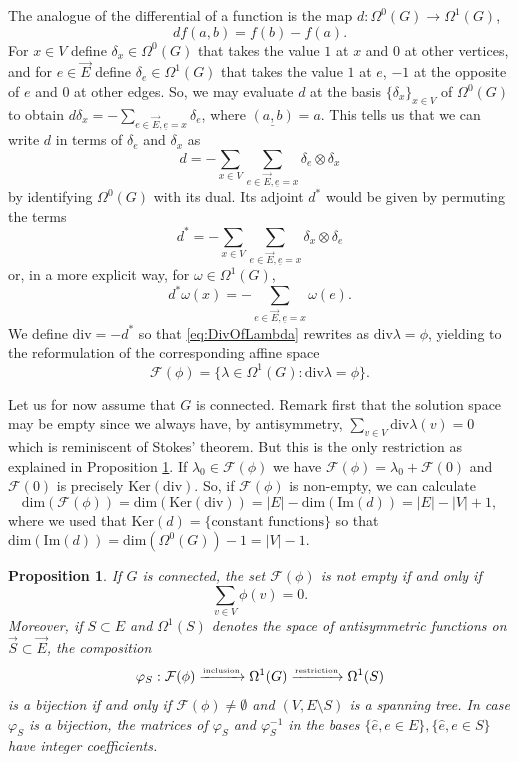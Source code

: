 \documentclass[11pt,a4paper]{amsart}
\numberwithin{equation}{section}
\newtheorem{proposition}[theorem]{Proposition}
\theoremstyle{definition}
\begin{document}
The analogue of the differential
of a function is the map
$d: \Omega^0(G) \to \Omega^1(G)$,
\[d f (a,b) = f(b) - f(a).\] 
For $x \in V$ define $\delta_{x} \in \Omega^0(G)$ 
that takes the value
 $1$ at $x$ and $0$ at other vertices, and
for $e \in \vec E$ define
$\delta_{e} \in \Omega^1(G)$ that takes the value
$1$ at $e$, $-1$ at the opposite of $e$
and $0$ at other edges. So, we may evaluate
$d$ at the basis
$\{\delta_{x} \}_{x \in V}$ of $\Omega^0(G)$ to obtain
$d \delta_{x} = -\sum_{e \in \vec E,\underline e = x} \delta_{e}$,
where $\underline {(a,b)} = a$. This tells
us that we can write $d$ in terms of 
$\delta_{e}$ and $\delta_{x}$ as
\[d = -\sum_{x \in V} 
\sum_{e \in \vec E, \underline e = x} \delta_{e} \otimes \delta_{x}\]
by identifying
$\Omega^0(G)$ with its dual. Its adjoint $d^*$
would be given by permuting the terms
\[d^* = -\sum_{x \in V} 
\sum_{e \in \vec E, \underline e = x}  \delta_{x} \otimes \delta_{e}\]
or, in a more explicit way, for 
$\omega \in \Omega^1(G)$,
\[d^* \omega (x) = - \sum_{e \in \vec E, \underline e=x}
\omega(e) .\]
We define $\mathrm {div} = -d^*$ so that 
	\eqref{eq:DivOfLambda}
rewrites as
	$\mathrm{div}\lambda = \phi$, yielding to the reformulation of the corresponding affine space 
	 \[\mathcal F(\phi)
	 = 	\{\lambda \in \Omega^1(G):
	  \mathrm{div}\lambda = \phi
	 \}.\]
	 
Let us for now assume that $G$ is connected. Remark first that the solution space may be empty since we
always have, by antisymmetry,
	$\sum_{v \in V} \mathrm{div} \lambda (v)
	= 0$
	which is reminiscent of
	Stokes' theorem. But this is the only
	restriction as explained in Proposition \ref{prop:BijectionTrees}. If
	$\lambda_0 \in \mathcal F(\phi)$ we have
	$\mathcal F(\phi) = 
	\lambda_0 + \mathcal F(0)$ and
	$\mathcal F(0)$ is precisely
	$\mathrm{Ker}(\mathrm{div})$. So, if
	$\mathcal F(\phi)$ is non-empty,
	we can calculate
	\[\mathrm{dim}(\mathcal F(\phi))
	= \mathrm{dim}(\mathrm{Ker}(\mathrm{div}))
	= |E| - \mathrm{dim}(\mathrm{Im}(d))
	= |E| - |V| + 1,\]
	where we used that $\mathrm{Ker}(d) =
	\{\mbox{constant functions}\} $
	 so that
	$ \mathrm{dim}(\mathrm{Im}(d)) = 
	\mathrm{dim}(\Omega^0(G)) - 1 = |V|-1$.
	
	
\begin{proposition} \label{prop:BijectionTrees}
	If $G$ is connected, the set
	$\mathcal F(\phi) $ is not empty if and only if
\begin{equation} \label{eq:ExistenceCondition}
\sum_{v \in V} \phi(v)=0.
\end{equation}
	Moreover, if $S \subset E$
	and  $\Omega^1(S)$ denotes the space of antisymmetric
	functions on $\vec S \subset \vec E$, the composition
	\[\varphi_S:\mathcal F(\phi) \xrightarrow[]{
	\mbox{\tiny inclusion}}
	\Omega^1(G) 
	\xrightarrow[]{
		\mbox{\tiny restriction}} \Omega^1(S)\]
	is a bijection if and only if $\mathcal F(\phi)
	\neq \emptyset$
	 and
	$(V,E \setminus S)$ is a spanning tree.
	In case $\varphi_S$ is a bijection, the matrices of $\varphi_S$ and $\varphi_S^{-1}$ in the bases $\{\hat{e},e\in E\},\{\hat{e},e\in S\}$
have integer coefficients.	
\end{proposition}
\end{document}
